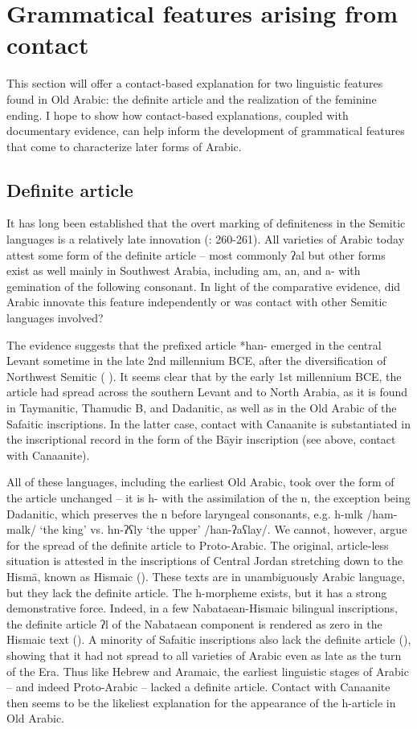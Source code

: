 \documentclass[output=paper]{langsci/langscibook}
\begin{document}
\section{Grammatical features arising from contact}
This section will offer a contact-based explanation for two linguistic features found in Old Arabic: the definite article and the realization of the feminine ending. I hope to show how contact-based explanations, coupled with documentary evidence, can help inform the development of grammatical features that come to characterize later forms of Arabic.

\subsection{Definite article}
It has long been established that the overt marking of definiteness in the Semitic languages is a relatively late innovation (\citet{Huehnergard & Rubin 2011}: 260-261). All varieties of Arabic today attest some form of the definite article – most commonly ʔal but other forms exist as well mainly in Southwest Arabia, including am, an, and a- with gemination of the following consonant. In light of the comparative evidence, did Arabic innovate this feature independently or was contact with other Semitic languages involved?

The evidence suggests that the prefixed article *han- emerged in the central Levant sometime in the late 2nd millennium BCE, after the diversification of Northwest Semitic (\citet{Gzella 2006} \citet{Tropper 2001} \citet{Pat-El 2006}). It seems clear that by the early 1st millennium BCE, the article had spread across the southern Levant and to North Arabia, as it is found in Taymanitic, Thamudic B, and Dadanitic, as well as in the Old Arabic of the Safaitic inscriptions. In the latter case, contact with Canaanite is substantiated in the inscriptional record in the form of the Bāyir inscription (see above, contact with Canaanite). 

All of these languages, including the earliest Old Arabic, took over the form of the article unchanged – it is h- with the assimilation of the n, the exception being Dadanitic, which preserves the n before laryngeal consonants, e.g. h-mlk /ham-malk/ ‘the king’ vs. hn-ʔʕly ‘the upper’ /han-ʔaʕlay/. We cannot, however, argue for the spread of the definite article to Proto-Arabic. The original, article-less situation is attested in the inscriptions of Central Jordan stretching down to the Hismā, known as Hismaic (\citet{Graf and Zwettler 2004}). These texts are in unambiguously Arabic language, but they lack the definite article. The h-morpheme exists, but it has a strong demonstrative force. Indeed, in a few Nabataean-Hismaic bilingual inscriptions, the definite article ʔl of the Nabataean component is rendered as zero in the Hismaic text (\citet{Hayajneh 2009}). A minority of Safaitic inscriptions also lack the definite article (\citet{(Al-Jallad2018ANA}), showing that it had not spread to all varieties of Arabic even as late as the turn of the Era. Thus like Hebrew and Aramaic, the earliest linguistic stages of Arabic – and indeed Proto-Arabic – lacked a definite article. Contact with Canaanite then seems to be the likeliest explanation for the appearance of the h-article in Old Arabic.
\end{document}
